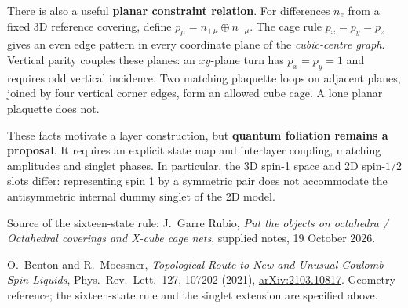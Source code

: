 \documentclass[10pt,a4paper]{article}
\newcommand{\xor}{\mathbin{\oplus}}
\begin{document}
There is also a useful \textbf{planar constraint relation}. For differences $n_e$
from a fixed 3D reference covering, define
$p_\mu=n_{+\mu}\xor n_{-\mu}$. The cage rule $p_x=p_y=p_z$ gives an even edge
pattern in every coordinate plane of the \emph{cubic-centre graph}. Vertical parity
couples these planes: an $xy$-plane turn has $p_x=p_y=1$ and requires odd vertical
incidence. Two matching plaquette loops on adjacent planes, joined by four vertical
corner edges, form an allowed cube cage. A lone planar plaquette does not.

These facts motivate a layer construction, but \textbf{quantum foliation remains a
proposal}. It requires an explicit state map and interlayer coupling, matching
amplitudes and singlet phases. In particular, the 3D spin-1 space and 2D spin-$1/2$
slots differ: representing spin 1 by a symmetric pair does not accommodate the
antisymmetric internal dummy singlet of the 2D model.

{\footnotesize
Source of the sixteen-state rule: J.~Garre Rubio, \emph{Put the objects on octahedra /
Octahedral coverings and X-cube cage nets}, supplied notes, 19 October 2026.\par
[4] O.~Benton and R.~Moessner, \emph{Topological Route to New and Unusual Coulomb Spin
Liquids}, Phys.~Rev.~Lett.~127, 107202 (2021),
\href{https://arxiv.org/abs/2103.10817}{arXiv:2103.10817}. Geometry reference;
the sixteen-state rule and the singlet extension are specified above.}
\end{document}
